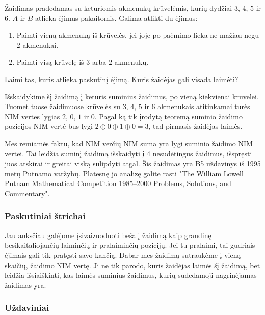 \begin{pavnr}
  Žaidimas pradedamas su keturiomis akmenukų krūvelėmis, kurių dydžiai $3$,
  $4$, $5$ ir $6$. $A$ ir $B$ atlieka ėjimus pakaitomis. Galima atlikti du
  ėjimus:
  \begin{enumerate}
    \item Paimti vieną akmenuką iš krūvelės, jei joje po paėmimo lieka ne
      mažiau negu $2$ akmenukai.
    \item Paimti visą krūvelę iš $3$ arba $2$ akmenukų.
  \end{enumerate}
  Laimi tas, kuris atlieka paskutinį ėjimą. Kuris žaidėjas gali visada laimėti?
\end{pavnr}

\begin{sprendimas}
  Išskaidykime šį žaidimą į keturis suminius žaidimus, po vieną kiekvienai
  krūvelei. Tuomet tuose žaidimuose krūvelės su $3$, $4$, $5$ ir $6$
  akmenukais atitinkamai turės NIM vertes lygias $2$, $0$, $1$ ir $0$.
  Pagal ką tik įrodytą teoremą suminio žaidimo pozicijos NIM vertė bus lygi
  $2\oplus 0\oplus 1\oplus 0=3$, tad pirmasis žaidėjas laimės. 
\end{sprendimas}

\begin{pastaba}
  Mes remiamės faktu, kad NIM verčių NIM suma yra lygi suminio žaidimo NIM
  vertei. Tai leidžia suminį žaidimą išskaidyti į 4 nesudėtingus žaidimus,
  išspręsti juos atskirai ir greitai viską sulipdyti atgal. Šis žaidimas
  yra B5 uždavinys iš 1995 metų Putnamo varžybų. Platesnę jo analizę galite
  rasti "The William Lowell Putnam Mathematical Competition 1985–2000
  Problems, Solutions, and Commentary".
\end{pastaba}

\subsubsection{Paskutiniai štrichai}

Jau anksčiau galėjome įsivaizuoduoti bešalį žaidimą kaip grandinę
besikaitaliojančių laiminčių ir pralaiminčių pozicijų. Jei tu pralaimi, tai
gudriais ėjimais gali tik pratęsti savo kančią. Dabar mes žaidimą
sutraukėme į vieną skaičių, žaidimo NIM vertę. Ji ne tik parodo, kuris
žaidėjas laimės šį žaidimą, bet leidžia išsiaiškinti, kas laimės suminius
žaidimus, kurių sudedamoji nagrinėjamas žaidimas yra. 

\subsubsection{Uždaviniai}

